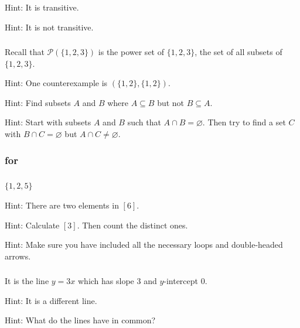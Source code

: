 \subsubsection*{ \answers}
\begin{apart}
    \item Hint: It is transitive.
    \item Hint: It is not transitive.
\end{apart}

\subsubsection*{ \answers}
Recall that $\mathscr{P}(\{1,2,3\})$ is the power set of $\{1,2,3\}$, the set of all subsets of $\{1,2,3\}$.
\begin{apart}
    \item Hint: One counterexample is $(\{1,2\},\{1,2\})$.
    \item Hint: Find subsets $A$ and $B$ where $A \subseteq B$ but not $B \subseteq A$.
    \item Hint: Start with subsets $A$ and $B$ such that $A \cap B = \varnothing$.  Then try to find a set $C$ with $B \cap C = \varnothing$ but $A \cap C \neq \varnothing$.
\end{apart}

\subsubsection{\answers for 
\subequivclass}

\subsubsection*{ \answers}
\begin{apart}
    \item $\{1,2,5\}$
    \item Hint: There are two elements in $[6]$.
    \item Hint: Calculate $[3]$.  Then count the distinct ones.
    \item Hint: Make sure you have included all the necessary loops and double-headed arrows.
\end{apart}

\subsubsection*{ \answers}
\begin{apart}
    \item It is the line $y = 3x$ which has slope 3 and $y$-intercept 0.
    \item Hint: It is a different line.
    \item Hint: What do the lines have in common?
\end{apart}

